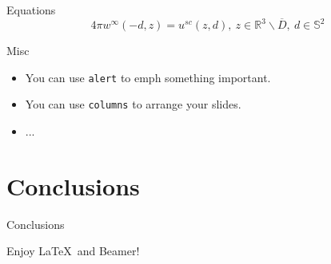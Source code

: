 \documentclass[aspectratio=169]{beamer}
\begin{document}
\begin{frame}{Equations}
	\begin{equation}
		4\pi w^{\infty}\left(-d, z\right) = u^{sc}\left(z, d\right),\ z \in \mathbb{R}^{3}\backslash \overline{D},\ d \in \mathbb{S}^{2}
	\end{equation}	
\end{frame}


\begin{frame}{Misc}
	\begin{itemize}
		\item<1-> You can use \texttt{alert}  to emph \alert{something important}.
		\item<2-> You can use \texttt{columns} to arrange your slides.
		\item<3-> ...
	\end{itemize}
	
\end{frame}


\section{Conclusions}


\begin{frame}{Conclusions}
	\begin{center}
		Enjoy \LaTeX\ and Beamer!
	\end{center}
\end{frame}
\end{document}
